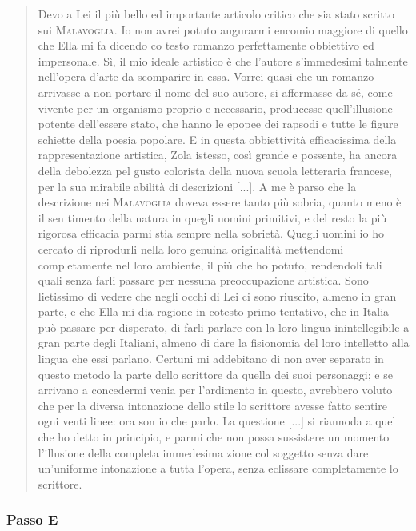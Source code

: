 \documentclass{book}
\begin{document}
\begin{quote}
Devo a Lei il più bello ed importante articolo critico che sia stato scritto sui \textsc{Malavoglia}. Io non avrei potuto augurarmi encomio maggiore di quello che Ella mi fa dicendo co testo romanzo perfettamente obbiettivo ed impersonale. Sì, il mio ideale artistico è che l'autore s'immedesimi talmente nell'opera d'arte da scomparire in essa. Vorrei quasi che un romanzo arrivasse a non portare il nome del suo autore, si affermasse da sé, come vivente per un organismo proprio e necessario, producesse quell'illusione potente dell'essere stato, che hanno le epopee dei rapsodi e tutte le figure schiette della poesia popolare. E in questa obbiettività efficacissima della rappresentazione artistica, Zola istesso, così grande e possente, ha ancora della debolezza pel gusto colorista della nuova scuola letteraria francese, per la sua mirabile abilità di descrizioni [...]. A me è parso che la descrizione nei \textsc{Malavoglia} doveva essere tanto più sobria, quanto meno è il sen timento della natura in quegli uomini primitivi, e del resto la più rigorosa efficacia parmi stia sempre nella sobrietà. Quegli uomini io ho cercato di riprodurli nella loro genuina originalità mettendomi completamente nel loro ambiente, il più che ho potuto, rendendoli tali quali senza farli passare per nessuna preoccupazione artistica. Sono lietissimo di vedere che negli occhi di Lei ci sono riuscito, almeno in gran parte, e che Ella mi dia ragione in cotesto primo tentativo, che in Italia può passare per disperato, di farli parlare con la loro lingua inintellegibile a gran parte degli Italiani, almeno di dare la fisionomia del loro intelletto alla lingua che essi parlano. Certuni mi addebitano di non aver separato in questo metodo la parte dello scrittore da quella dei suoi personaggi; e se arrivano a concedermi venia per l'ardimento in questo, avrebbero voluto che per la diversa intonazione dello stile lo scrittore avesse fatto sentire ogni venti linee: ora son io che parlo. La questione [...] si riannoda a quel che ho detto in principio, e parmi che non possa sussistere un momento l'illusione della completa immedesima zione col soggetto senza dare un'uniforme intonazione a tutta l'opera, senza eclissare completamente lo scrittore.
\end{quote}

\subsubsection{Passo E}
\end{document}
